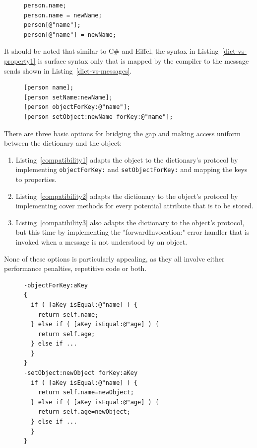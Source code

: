 \documentclass[preprint]{sigplanconf}
\begin{document}
\begin{figure}[htbp]
\begin{lstlisting}[style=numbers,label=dict-vs-property1,caption=Dictionary vs. Property.]
person.name;
person.name = newName;
person[@"name"];
person[@"name"] = newName;
\end{lstlisting}
\end{figure}

It should be noted that similar to C\# and Eiffel, the syntax in  Listing~\ref{dict-vs-property1}
is surface syntax only that is mapped by the compiler to the message sends shown in
Listing~\ref{dict-vs-messages}.  

\begin{figure}[htbp]
\begin{lstlisting}[style=numbers,label=dict-vs-messages,caption=Dictionary vs. Property.]
[person name];
[person setName:newName];
[person objectForKey:@"name"];
[person setObject:newName forKey:@"name"];
\end{lstlisting}
\end{figure}

There are three basic options for bridging the gap and making access uniform between the
dictionary and the object:
\begin{enumerate}
\item  Listing~\ref{compatibility1} adapts the object to the dictionary's protocol by
	 implementing {\tt objectForKey:} and {\tt setObjectForKey:} and mapping the keys
	 to properties.
\item Listing~\ref{compatibility2} adapts the dictionary to the object's protocol by 
	implementing cover methods for every potential attribute that is to be stored.
\item Listing~\ref{compatibility3} also adapts the dictionary to the object's protocol, but
	this time by implementing the "forwardInvocation:" error handler that is invoked
	when a message is not understood by an object.
\end{enumerate}

None of these options is particularly appealing, as they all involve either performance penalties,
repetitive code or both.
	
\begin{figure}[htbp]
\begin{lstlisting}[style=numbers,label=compatibility1,caption=Making an object dictionary-compatible.]
-objectForKey:aKey
{
  if ( [aKey isEqual:@"name] ) {
    return self.name;		
  } else if ( [aKey isEqual:@"age] ) {
    return self.age;
  } else if ...
  }
}
-setObject:newObject forKey:aKey 
  if ( [aKey isEqual:@"name] ) {
    return self.name=newObject;		
  } else if ( [aKey isEqual:@"age] ) {
    return self.age=newObject;
  } else if ...
  }
}
\end{lstlisting}
\end{figure}
\end{document}
